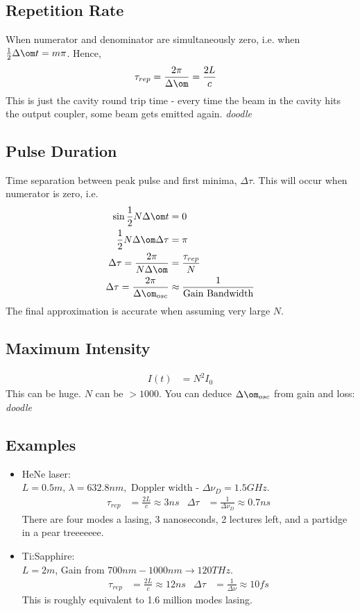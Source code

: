 \documentclass[a4paper, 11pt, normalem]{report}
\begin{document}
\subsection{Repetition Rate}
When numerator and denominator are simultaneously zero, i.e. when $\frac12\Delta\om t = m\pi$.
Hence, 
\begin{align}
    \tau_{rep} &= \frac{2\pi}{\Delta\om} = \frac{2L}{c}
\end{align}
This is just the cavity round trip time - every time the beam in the cavity hits the output coupler, some beam gets emitted again.
\textit{doodle}

\subsection{Pulse Duration}
Time separation between peak pulse and first minima, $\Delta\tau$.
This will occur when numerator is zero, i.e. 
\begin{align}
    \sin\frac12N\Delta\om t &= 0 \\
    \frac12 N\Delta\om\Delta \tau &= \pi \\
    \Delta\tau = \frac{2\pi}{N\Delta\om} &= \frac{\tau_{rep}}{N} \\
    \Delta\tau = \frac{2\pi}{\Delta\om_{osc}} &\approx \frac{1}{\text{Gain Bandwidth}}
\end{align}
The final approximation is accurate when assuming very large $N$.

\subsection{Maximum Intensity}
\begin{align}
    I(t) &= N^2I_0
\end{align}
This can be huge. 
$N$ can be $>1000$.
You can deduce $\Delta\om_{osc}$ from gain and loss:
\textit{doodle}

\subsection{Examples}
\begin{itemize}
    \item HeNe laser:\\
        $L=0.5m,\,\lambda = 632.8nm,$ Doppler width - $\Delta\nu_D = 1.5GHz$.
        \begin{align}
            \tau_{rep} &= \frac{2L}{c} \approx 3ns &
            \Delta\tau &= \frac{1}{\Delta\nu_D} \approx 0.7ns
        \end{align}
        There are four modes a lasing, 3 nanoseconds, 2 lectures left, and a partidge in a pear treeeeeee. 
    \item Ti:Sapphire:\\
        $L=2m$, Gain from $700nm-1000nm \to 120 THz$.
        \begin{align}
            \tau_{rep} &= \frac{2L}{c} \approx 12ns &
            \Delta\tau &= \frac{1}{\Delta\nu} \approx 10fs
        \end{align}
        This is roughly equivalent to 1.6 million modes lasing.
\end{itemize}
\end{document}
